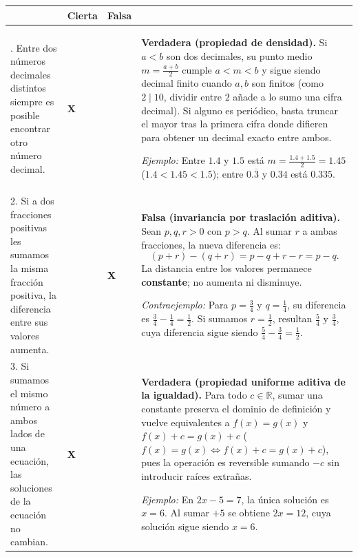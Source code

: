 \documentclass[spanish,letterpaper]{article}
\begin{document}
\noindent\begin{tabularx}{\textwidth}{|>{\raggedright\arraybackslash}p{}|>{\centering\arraybackslash}p{}|>{\centering\arraybackslash}p{}|>{\raggedright\arraybackslash}X|}
\hline
\rowcolor{iiiepePale}
\multicolumn{1}{|c|}{\textbf{Afirmación}} & \textbf{Cierta} & \textbf{Falsa} & \multicolumn{1}{c|}{\textbf{Justificación (argumento, ejemplo o contraejemplo)}} \\\hline

1. Entre dos números decimales distintos siempre es posible encontrar otro número decimal. &
\textbf{\large\color{okGreen}X} &
&
\textbf{Verdadera (propiedad de densidad).} Si $a < b$ son dos decimales, su punto medio $m = \frac{a+b}{2}$ cumple $a < m < b$ y sigue siendo decimal finito cuando $a,b$ son finitos (como $2 \mid 10$, dividir entre $2$ añade a lo sumo una cifra decimal). Si alguno es periódico, basta truncar el mayor tras la primera cifra donde difieren para obtener un decimal exacto entre ambos.\par\smallskip
\textit{Ejemplo:} Entre $1.4$ y $1.5$ está $m = \frac{1.4+1.5}{2} = 1.45$ ($1.4 < 1.45 < 1.5$); entre $0.\overline{3}$ y $0.34$ está $0.335$. \\\hline

2. Si a dos fracciones positivas les sumamos la misma fracción positiva, la diferencia entre sus valores aumenta. &
&
\textbf{\large\color{errRed}X} &
\textbf{Falsa (invariancia por traslación aditiva).} Sean $p, q, r > 0$ con $p > q$. Al sumar $r$ a ambas fracciones, la nueva diferencia es:
\[
(p + r) - (q + r) = p - q + r - r = p - q.
\]
La distancia entre los valores permanece \textbf{constante}; no aumenta ni disminuye.\par
\textit{Contraejemplo:} Para $p = \frac{3}{4}$ y $q = \frac{1}{4}$, su diferencia es $\frac{3}{4}-\frac{1}{4}=\frac{1}{2}$. Si sumamos $r = \frac{1}{2}$, resultan $\frac{5}{4}$ y $\frac{3}{4}$, cuya diferencia sigue siendo $\frac{5}{4}-\frac{3}{4}=\frac{1}{2}$. \\\hline

3. Si sumamos el mismo número a ambos lados de una ecuación, las soluciones de la ecuación no cambian. &
\textbf{\large\color{okGreen}X} &
&
\textbf{Verdadera (propiedad uniforme aditiva de la igualdad).} Para todo $c \in \mathbb{R}$, sumar una constante preserva el dominio de definición y vuelve equivalentes a $f(x) = g(x)$ y $f(x) + c = g(x) + c$ ($f(x)=g(x) \iff f(x)+c=g(x)+c$), pues la operación es reversible sumando $-c$ sin introducir raíces extrañas.\par\smallskip
\textit{Ejemplo:} En $2x - 5 = 7$, la única solución es $x = 6$. Al sumar $+5$ se obtiene $2x = 12$, cuya solución sigue siendo $x = 6$. \\\hline


\end{tabularx}
\end{document}
